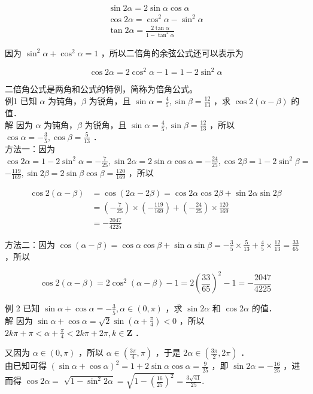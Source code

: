 \documentclass[10pt]{article}
\begin{document}
\[
\begin{gathered}
\sin 2 \alpha=2 \sin \alpha \cos \alpha \\
\cos 2 \alpha=\cos ^{2} \alpha-\sin ^{2} \alpha \\
\tan 2 \alpha=\frac{2 \tan \alpha}{1-\tan ^{2} \alpha}
\end{gathered}
\]

因为 \(\sin ^{2} \alpha+\cos ^{2} \alpha=1\) ，所以二倍角的余弦公式还可以表示为

\[
\cos 2 \alpha=2 \cos ^{2} \alpha-1=1-2 \sin ^{2} \alpha
\]

二倍角公式是两角和公式的特例，简称为倍角公式。\\
例1 已知 \(\alpha\) 为钝角，\(\beta\) 为锐角，且 \(\sin \alpha=\frac{4}{5}, \sin \beta=\frac{12}{13}\) ，求 \(\cos 2(\alpha-\beta)\) 的值．\\
解 因为 \(\alpha\) 为钝角，\(\beta\) 为锐角，且 \(\sin \alpha=\frac{4}{5}, \sin \beta=\frac{12}{13}\) ，所以 \(\cos \alpha=-\frac{3}{5}, \cos \beta=\frac{5}{13}\) ．\\
方法一：因为 \(\cos 2 \alpha=1-2 \sin ^{2} \alpha=-\frac{7}{25}, \sin 2 \alpha=2 \sin \alpha \cos \alpha=-\frac{24}{25}, \cos 2 \beta=1-2 \sin ^{2} \beta=\) \(-\frac{119}{169}, \sin 2 \beta=2 \sin \beta \cos \beta=\frac{120}{169}\) ，所以

\[
\begin{aligned}
\cos 2(\alpha-\beta) & =\cos (2 \alpha-2 \beta)=\cos 2 \alpha \cos 2 \beta+\sin 2 \alpha \sin 2 \beta \\
& =\left(-\frac{7}{25}\right) \times\left(-\frac{119}{169}\right)+\left(-\frac{24}{25}\right) \times \frac{120}{169} \\
& =-\frac{2047}{4225}
\end{aligned}
\]

方法二：因为 \(\cos (\alpha-\beta)=\cos \alpha \cos \beta+\sin \alpha \sin \beta=-\frac{3}{5} \times \frac{5}{13}+\frac{4}{5} \times \frac{12}{13}=\frac{33}{65}\) ，所以

\[
\cos 2(\alpha-\beta)=2 \cos ^{2}(\alpha-\beta)-1=2\left(\frac{33}{65}\right)^{2}-1=-\frac{2047}{4225}
\]

例 2 已知 \(\sin \alpha+\cos \alpha=-\frac{3}{5}, \alpha \in(0, \pi)\) ，求 \(\sin 2 \alpha\) 和 \(\cos 2 \alpha\) 的值．\\
解 因为 \(\sin \alpha+\cos \alpha=\sqrt{2} \sin \left(\alpha+\frac{\pi}{4}\right)<0\) ，所以 \(2 k \pi+\pi<\alpha+\frac{\pi}{4}<2 k \pi+2 \pi, k \in \mathbf{Z}\) ．

又因为 \(\alpha \in(0, \pi)\) ，所以 \(\alpha \in\left(\frac{3 \pi}{4}, \pi\right)\) ，于是 \(2 \alpha \in\left(\frac{3 \pi}{2}, 2 \pi\right)\) ．\\
由已知可得 \((\sin \alpha+\cos \alpha)^{2}=1+2 \sin \alpha \cos \alpha=\frac{9}{25}\) ，即 \(\sin 2 \alpha=-\frac{16}{25}\) ，进而得 \(\cos 2 \alpha=\) \(\sqrt{1-\sin ^{2} 2 \alpha}=\sqrt{1-\left(\frac{16}{25}\right)^{2}}=\frac{3 \sqrt{41}}{25}\).
\end{document}
